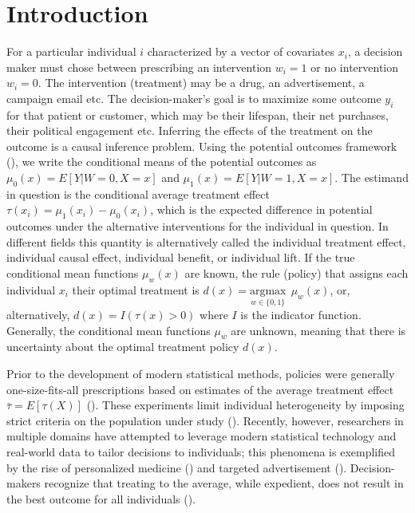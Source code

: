 \section{Introduction}

For a particular individual $i$ characterized by a vector of covariates $x_i$, a decision maker must chose between prescribing an intervention $w_i=1$ or no intervention $w_i=0$. The intervention (treatment) may be a drug, an advertisement, a campaign email etc. The decision-maker's goal is to maximize some outcome $y_i$ for that patient or customer, which may be their lifespan, their net purchases, their political engagement etc. Inferring the effects of the treatment on the outcome is a causal inference problem. Using the potential outcomes framework (\citealp{Rubin2005}), we write the conditional means of the potential outcomes as $\mu_0(x) = E[Y|W=0,X=x]$ and $\mu_1(x) = E[Y|W=1,X=x]$. The estimand in question is the conditional average treatment effect $\tau(x_i) = \mu_1(x_i) - \mu_0(x_i)$, which is the expected difference in potential outcomes under the alternative interventions for the individual in question. In different fields this quantity is alternatively called the individual treatment effect, individual causal effect, individual benefit, or individual lift. If the true conditional mean functions $\mu_w(x)$ are known, the rule (policy) that assigns each individual $x_i$ their optimal treatment is $d(x) = \underset{w \in \{0,1\}}{\text{argmax}} \ \ \mu_w(x)$, or, alternatively, $d(x) = I(\tau(x) > 0)$ where $I$ is the indicator function. Generally, the conditional mean functions $\mu_w$ are unknown, meaning that there is uncertainty about the optimal treatment policy $d(x)$.

Prior to the development of modern statistical methods, policies were generally one-size-fits-all prescriptions based on estimates of the average treatment effect $\bar\tau = E[\tau(X)]$ (\citealp{Segal:ub}). These experiments limit individual heterogeneity by imposing strict criteria on the population under study (\citealp{Stuart:2014id}). Recently, however, researchers in multiple domains have attempted to leverage modern statistical technology and real-world data to tailor decisions to individuals; this phenomena is exemplified by the rise of personalized medicine (\citealp{Ferreira:2017fv}) and targeted advertisement (\citealp{Ascarza:2018ie, Matz:2017ix}). Decision-makers recognize that treating to the average, while expedient, does not result in the best outcome for all individuals (\citealp{Kravitz:2004fa,Segal:ub}). 

